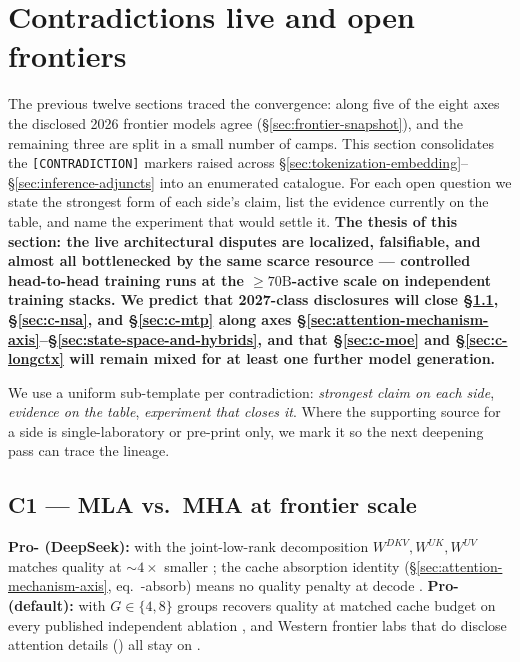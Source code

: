 
\section{Contradictions live and open frontiers}
\label{sec:contradictions}

The previous twelve sections traced the convergence: along five of the
eight axes the disclosed 2026 frontier models agree
(\S\ref{sec:frontier-snapshot}), and the remaining three are split in a
small number of camps. This section consolidates the
\texttt{[CONTRADICTION]} markers raised across
\S\ref{sec:tokenization-embedding}--\S\ref{sec:inference-adjuncts}
into an enumerated catalogue. For each open question we state the
strongest form of each side's claim, list the evidence currently on the
table, and name the experiment that would settle it. \textbf{The thesis
of this section: the live architectural disputes are localized,
falsifiable, and almost all bottlenecked by the same scarce resource ---
controlled head-to-head training runs at the $\geq 70\mathrm{B}$-active
scale on independent training stacks. We predict that 2027-class
disclosures will close \S\ref{sec:c-mla}, \S\ref{sec:c-nsa}, and
\S\ref{sec:c-mtp} along axes
\S\ref{sec:attention-mechanism-axis}--\S\ref{sec:state-space-and-hybrids}, and that
\S\ref{sec:c-moe} and \S\ref{sec:c-longctx} will remain mixed for at
least one further model generation.}

We use a uniform sub-template per contradiction: \emph{strongest claim
on each side}, \emph{evidence on the table}, \emph{experiment that
closes it}. Where the supporting source for a side is single-laboratory
or pre-print only, we mark it \deepencite{} so the next deepening pass
can trace the lineage.

\subsection{C1 --- MLA vs.\ MHA at frontier scale}
\label{sec:c-mla}

\textbf{Pro- (DeepSeek):}  with the
joint-low-rank decomposition $W^{DKV}, W^{UK}, W^{UV}$ matches 
quality at $\sim 4\times$ smaller ; the cache absorption
identity (\S\ref{sec:attention-mechanism-axis}, eq.\ -absorb) means
no quality penalty at decode \citep[\S 2.1.4]{deepseek-v2}.
\textbf{Pro- (default):}  with $G \in \{4, 8\}$ groups recovers
 quality at matched cache budget on every published independent
ablation \citep[\S 3.1]{ainslie2023}, and Western frontier labs that do
disclose attention details (\citealp{meta-llama3, meta-llama4,
gemma3, qwen3}) all stay on .

